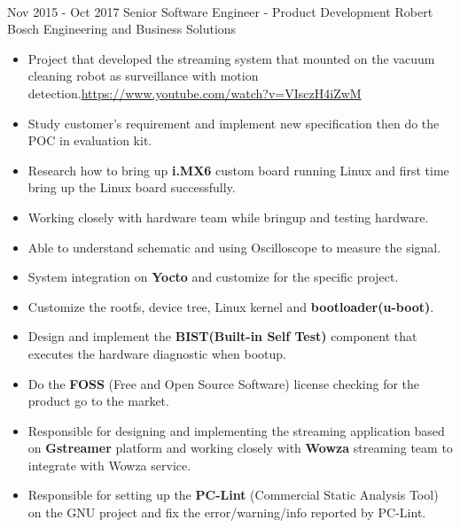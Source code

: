 \documentclass[letterpaper]{twentysecondcv} %
\begin{document}
\begin{twenty}
	\\
	\twentyitem
		{Nov 2015 -}
		{Oct 2017}
		{Senior Software Engineer - Product Development}
	    {Robert Bosch Engineering and Business Solutions}
	    {}
	    {\begin{itemize}
	    \item Project that developed the streaming system that mounted on the vacuum cleaning robot as
	    surveillance with motion detection.\url{https://www.youtube.com/watch?v=VIsczH4iZwM}
	    \item Study customer’s requirement and implement new specification then do the POC in evaluation kit.
	    \item Research how to bring up \textbf{i.MX6} custom board running Linux and first time bring up the
	    Linux board successfully.
	    \item Working closely with hardware team while bringup and testing hardware.
	    \item Able to understand schematic and using Oscilloscope to measure the signal.
	    \item System integration on \textbf{Yocto} and customize for the specific project.
	    \item Customize the rootfs, device tree, Linux kernel and \textbf{bootloader(u-boot)}.
	    \item Design and implement the \textbf{BIST(Built-in Self Test)} component that executes the hardware
	    diagnostic when bootup.
	    \item Do the \textbf{FOSS} (Free and Open Source Software) license checking for the product go to the
	    market.
	    \item Responsible for designing and implementing the streaming application based on \textbf{Gstreamer}
	    platform and working closely with \textbf{Wowza} streaming team to integrate with Wowza service.
	    \item Responsible for setting up the \textbf{PC-Lint} (Commercial Static Analysis Tool) on the GNU project and fix the error/warning/info reported by PC-Lint.
	    \end{itemize}}
        \end{twenty}
        \newpage
        \makeprofile
\end{document}
